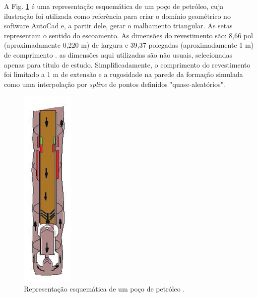 A Fig. \ref{fig:desenho_referencia_broca} é uma representação esquemática de um poço de petróleo, cuja ilustração foi utilizada como referência para criar o domínio geométrico no software AutoCad e, a partir dele, gerar o malhamento triangular. As setas representam o sentido do escoamento. As dimensões do revestimento são: 8,66 pol (aproximadamente 0,220 m) de largura e 39,37 polegadas (aproximadamente 1 m) de comprimento \cite{Rocha}. as dimensões aqui utilizadas são não usuais, selecionadas apenas para título de estudo. Simplificadamente, o comprimento do revestimento foi limitado a 1 m de extensão e a rugosidade na parede da formação simulada como uma interpolação por \textit{spline} de pontos definidos "quase-aleatórios".
\begin{figure}[H]
	\centering
	\includegraphics[scale=0.7]{img/casing1.png}
	\caption[Representação esquemática de um poço de petróleo.]{Representação esquemática de um poço de petróleo \cite{Erik}.}
	\label{fig:desenho_referencia_broca}
\end{figure}

